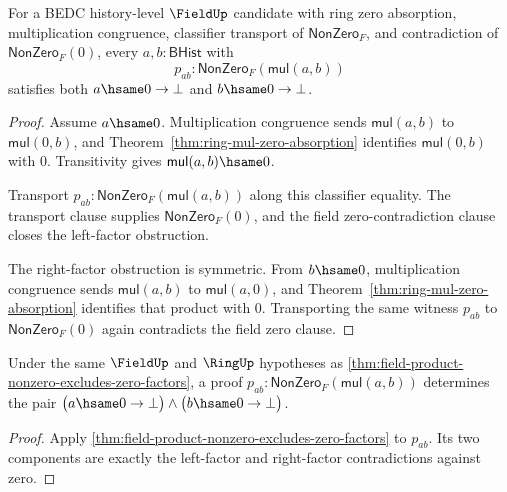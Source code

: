 \begin{theorem}
\label{thm:field-product-nonzero-excludes-zero-factors}
For a BEDC history-level $\FieldUp$ candidate with ring zero absorption,
multiplication congruence, classifier transport of $\mathsf{NonZero}_F$,
and contradiction of $\mathsf{NonZero}_F(0)$, every $a,b:\mathsf{BHist}$
with
$$
p_{ab}:\mathsf{NonZero}_F(\mathsf{mul}(a,b))
$$
satisfies both $a\hsame0\to\bot$ and $b\hsame0\to\bot$.
\end{theorem}
\begin{proof}
Assume $a\hsame0$. Multiplication congruence sends
$\mathsf{mul}(a,b)$ to $\mathsf{mul}(0,b)$, and
Theorem~\ref{thm:ring-mul-zero-absorption} identifies
$\mathsf{mul}(0,b)$ with $0$. Transitivity gives
$\mathsf{mul}(a,b)\hsame0$.

Transport $p_{ab}:\mathsf{NonZero}_F(\mathsf{mul}(a,b))$ along this
classifier equality. The transport clause supplies
$\mathsf{NonZero}_F(0)$, and the field zero-contradiction clause closes
the left-factor obstruction.

The right-factor obstruction is symmetric. From $b\hsame0$, multiplication
congruence sends $\mathsf{mul}(a,b)$ to $\mathsf{mul}(a,0)$, and
Theorem~\ref{thm:ring-mul-zero-absorption} identifies that product with
$0$. Transporting the same witness $p_{ab}$ to $\mathsf{NonZero}_F(0)$
again contradicts the field zero clause.
\end{proof}

\begin{corollary}
\label{thm:field-product-nonzero-empty-factors-absurd}
Under the same $\FieldUp$ and $\RingUp$ hypotheses as
\autoref{thm:field-product-nonzero-excludes-zero-factors}, a proof
$p_{ab}:\mathsf{NonZero}_F(\mathsf{mul}(a,b))$ determines the pair
$\bigl(a\hsame0\to\bot\bigr)\land\bigl(b\hsame0\to\bot\bigr)$.
\end{corollary}
\begin{proof}
Apply \autoref{thm:field-product-nonzero-excludes-zero-factors} to
$p_{ab}$. Its two components are exactly the left-factor and right-factor
contradictions against zero.
\end{proof}


